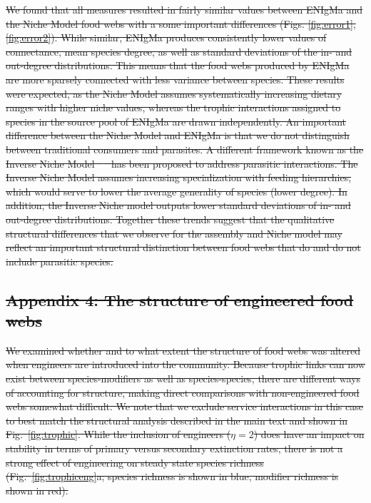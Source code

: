 \documentclass[twocolumn,preprintnumbers,amsmath,amssymb,superscriptaddress,linenumbers]{revtex4-1}
\providecommand{\DIFdel}[1]{{\protect\color{red}\sout{#1}}}                      %
\begin{document}
\DIFdel{We found that all measures resulted in fairly similar values between ENIgMa and the Niche Model food webs with a some important differences (Figs. \ref{fig:error1},\ref{fig:error2}).
While similar, ENIgMa produces consistently lower values of connectance, mean species degree, as well as standard deviations of the in- and out-degree distributions.
This means that the food webs produced by ENIgMa are more sparsely connected with less variance between species.
These results were expected, as the Niche Model assumes systematically increasing dietary ranges with higher niche values, whereas the trophic interactions assigned to species in the source pool of ENIgMa are drawn independently.
An important difference between the Niche Model and ENIgMa is that we do not distinguish between traditional consumers and parasites.
A different framework known as the Inverse Niche Model \mbox{%
\cite{Warren2010} }\hspace{0pt}%
has been proposed to address parasitic interactions.
The Inverse Niche Model assumes increasing specialization with feeding hierarchies, which would serve to lower the average generality of species (lower degree).
In addition, the Inverse Niche model outputs lower standard deviations of in- and out-degree distributions.
Together these trends suggest that the qualitative structural differences that we observe for the assembly and Niche model may reflect an important structural distinction between food webs that do and do not include parasitic species.
}%

\subsection*{\DIFdel{Appendix 4: The structure of engineered food webs}}
\DIFdel{We examined whether and to what extent the structure of food webs was altered when engineers are introduced into the community.
Because trophic links can now exist between species-modifiers as well as species-species, there are different ways of accounting for structure, making direct comparisons with non-engineered food webs somewhat difficult.
We note that we exclude service interactions in this case to best match the structural analysis described in the main text and shown in Fig.\ \ref{fig:trophic}.
While the inclusion of engineers ($\eta = 2$) does have an impact on stability in terms of primary versus secondary extinction rates, there is not a strong effect of engineering on steady state species richness (Fig.\ \ref{fig:trophiceng}a; species richness is shown in blue, modifier richness is shown in red).
}%
\end{document}
